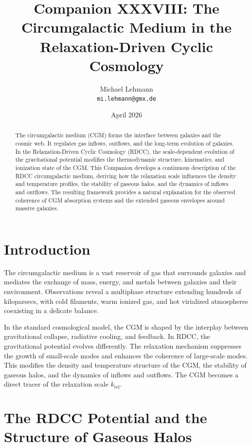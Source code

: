 \documentclass[11pt,a4paper]{article}
\title{\textbf{Companion XXXVIII: The Circumgalactic Medium in the Relaxation-Driven Cyclic Cosmology}}
\author{Michael Lehmann \\ \texttt{mi.lehmann@gmx.de}}
\date{April 2026}
\begin{document}
\maketitle

\begin{abstract}
The circumgalactic medium (CGM) forms the interface between galaxies and the cosmic 
web. It regulates gas inflows, outflows, and the long-term evolution of galaxies. 
In the Relaxation-Driven Cyclic Cosmology (RDCC), the scale-dependent evolution of 
the gravitational potential modifies the thermodynamic structure, kinematics, and 
ionization state of the CGM. This Companion develops a continuous description of 
the RDCC circumgalactic medium, deriving how the relaxation scale influences the 
density and temperature profiles, the stability of gaseous halos, and the dynamics 
of inflows and outflows. The resulting framework provides a natural explanation for 
the observed coherence of CGM absorption systems and the extended gaseous envelopes 
around massive galaxies.
\end{abstract}
\section{Introduction}

The circumgalactic medium is a vast reservoir of gas that surrounds galaxies and 
mediates the exchange of mass, energy, and metals between galaxies and their 
environment. Observations reveal a multiphase structure extending hundreds of 
kiloparsecs, with cold filaments, warm ionized gas, and hot virialized atmospheres 
coexisting in a delicate balance.

In the standard cosmological model, the CGM is shaped by the interplay between 
gravitational collapse, radiative cooling, and feedback. In RDCC, the gravitational 
potential evolves differently. The relaxation mechanism suppresses the growth of 
small-scale modes and enhances the coherence of large-scale modes. This modifies 
the density and temperature structure of the CGM, the stability of gaseous halos, 
and the dynamics of inflows and outflows. The CGM becomes a direct tracer of the 
relaxation scale $k_{\mathrm{rel}}$.
\section{The RDCC Potential and the Structure of Gaseous Halos}
\end{document}
